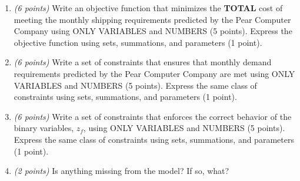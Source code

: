\documentclass[10pt]{article}
\begin{document}
\newpage
\begin{enumerate}
\item {\it (6 points)} Write an objective function that minimizes the {\bf TOTAL} cost of meeting the monthly shipping requirements predicted by the Pear Computer Company using ONLY VARIABLES and NUMBERS (5 points).  Express the objective function using sets, summations, and parameters (1 point).

\vfill

\item {\it (6 points)} Write a set of constraints that ensures that monthly demand requirements predicted by the Pear Computer Company are met using ONLY VARIABLES and NUMBERS (5 points).  Express the same class of constraints using sets, summations, and parameters (1 point).
\vfill

\newpage

\item {\it (6 points)} Write a set of constraints that enforces the correct behavior of the binary variables, $z_f$, using ONLY VARIABLES and NUMBERS (5 points).  Express the same class of constraints using sets, summations, and parameters (1 point).

\vfill


\item {\it (2 points)} Is anything missing from the model?  If so, what?  
\vfill

\end{enumerate}
\end{document}
